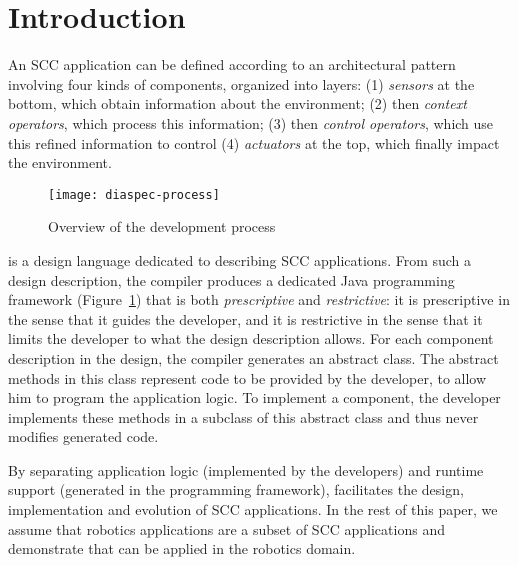 
\section{Introduction}

An SCC application can be defined according to an architectural
pattern involving four kinds of components, organized into layers: (1)
\emph{sensors} at the bottom, which obtain information about the
environment; (2) then \emph{context operators}, which process this
information; (3) then \emph{control operators}, which use this refined
information to control (4) \emph{actuators} at the top, which finally
impact the environment.

\begin{figure}
  \centering
  \texttt{[image: diaspec-process]}
  \caption{Overview of the \diaspec{} development process}
  \label{fig:diaspec-process}
\end{figure}

\diaspec{} is a design language dedicated to describing SCC
applications. From such a design description, the \diaspec{} compiler
produces a dedicated Java programming framework
(Figure~\ref{fig:diaspec-process}) that is both \emph{prescriptive}
and \emph{restrictive}: it is prescriptive in the sense that it guides
the developer, and it is restrictive in the sense that it limits the
developer to what the design description allows. For each component
description in the design, the compiler generates an abstract class.
The abstract methods in this class represent code to be provided by
the developer, to allow him to program the application logic. To
implement a component, the developer implements these methods in a
subclass of this abstract class and thus never modifies generated
code.

By separating application logic (implemented by the developers) and
runtime support (generated in the programming framework), \diaspec{}
facilitates the design, implementation and evolution of SCC
applications. In the rest of this paper, we assume that robotics
applications are a subset of SCC applications and demonstrate that
\diaspec{} can be applied in the robotics domain.




